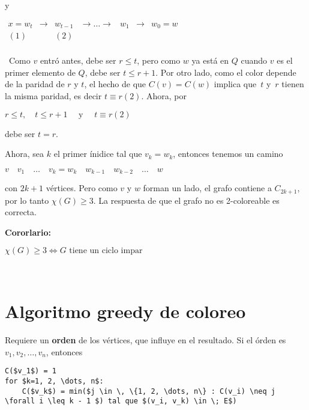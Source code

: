 \documentclass[10pt,a4paper]{article}
\begin{document}
\begin{center}
y
\end{center}

\begin{center}
$\begin{array}{ccccccc} x = w_t &\rightarrow &w_{t-1} &\rightarrow \dots \rightarrow &w_1 &\rightarrow &w_0 = w\\ (1) & &(2) & & & &\\ \end{array}$
\end{center}

 Como $v$ entró antes, debe ser $r\leq t$, pero como $w$ ya está en $Q$ cuando $v$ es el primer elemento de $Q$, debe ser $t \leq r + 1$. Por otro lado, como el color depende de la paridad de $r$ y $t$, el hecho de que $C(v) = C(w)$ implica que $t$ y $r$ tienen la misma paridad, es decir $t\equiv r( 2)$. Ahora, por

\begin{center}
$r \leq t,\quad t\leq r+1 \quad\text{ y }\quad t\equiv r(2)$
\end{center}

debe ser $t=r$.

Ahora, sea $k$ el primer ínidice tal que $v_k=w_k$, entonces tenemos un camino

\begin{center}
$v\quad v_1\quad\dots\quad v_k = w_k \quad w_{k-1}\quad w_{k-2} \quad \dots \quad w $
\end{center}

con $2 k + 1$ vértices. Pero como $v$ y $w$ forman un lado, el grafo contiene a $C_{2k+1}$, por lo tanto $\chi(G) \geq 3$. La respuesta de que el grafo no es 2-coloreable es correcta.

\textbf{Cororlario:}

$\chi(G) \geq 3 \Leftrightarrow G \text{ tiene un ciclo impar }$

 

\section*{Algoritmo greedy de coloreo}

Requiere un \textbf{orden} de los vértices, que influye en el resultado. Si el órden es $v_1, v_2, \dots, v_n$, entonces


    \begin{lstlisting}[language=pseudo]
C($v_1$) = 1
for $k=1, 2, \dots, n$:
    C($v_k$) = min($j \in \, \{1, 2, \dots, n\} : C(v_i) \neq j \forall i \leq k - 1 $) tal que $(v_i, v_k) \in \; E$)
\end{lstlisting}
\end{document}
